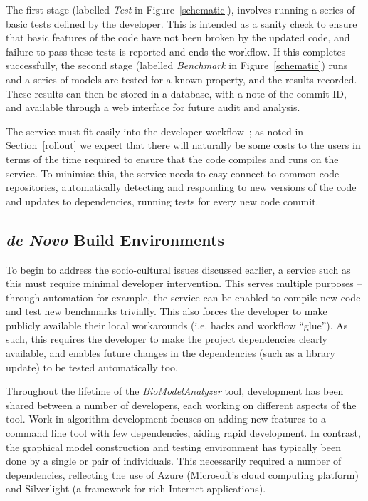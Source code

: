 \documentclass[conference]{IEEEtran}
\begin{document}
The first stage (labelled {\emph{Test}} in Figure~\ref{schematic}),
involves running a series of basic tests defined by the
developer. This is intended as a sanity check to ensure that basic
features of the code have not been broken by the updated code, and
failure to pass these tests is reported and ends the workflow. If this
completes successfully, the second stage (labelled {\emph{Benchmark}}
in Figure~\ref{schematic}) runs and a series of models are tested for
a known property, and the results recorded. These results can then be
stored in a database, with a note of the commit ID, and available
through a web interface for future audit and analysis.

The service must fit easily into the developer
workflow~\cite{venters-et-al:2014}; as noted in Section~\ref{rollout}
we expect that there will naturally be some costs to the users in
terms of the time required to ensure that the code compiles and runs
on the service. To minimise this, the service needs to easy connect to
common code repositories, automatically detecting and responding to
new versions of the code and updates to dependencies, running tests
for every new code commit.

\subsection{{\emph{de Novo}} Build Environments}

To begin to address the socio-cultural issues discussed earlier, a
service such as this must require minimal developer intervention.
This serves multiple purposes -- through automation for example, the
service can be enabled to compile new code and test new benchmarks
trivially. This also forces the developer to make publicly available
their local workarounds (i.e. hacks and workflow ``glue''). As such,
this requires the developer to make the project dependencies clearly
available, and enables future changes in the dependencies (such as a
library update) to be tested automatically too.

Throughout the lifetime of the {\emph{BioModelAnalyzer}} tool,
development has been shared between a number of developers, each
working on different aspects of the tool. Work in algorithm
development focuses on adding new features to a command line tool with
few dependencies, aiding rapid development. In contrast, the graphical
model construction and testing environment has typically been done by
a single or pair of individuals.  This necessarily required a number
of dependencies, reflecting the use of Azure (Microsoft's cloud
computing platform) and Silverlight (a framework for rich Internet
applications).
\end{document}
